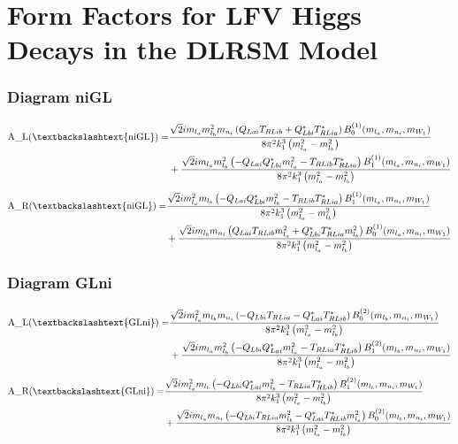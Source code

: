 \documentclass{article}
\begin{document}
\section*{Form Factors for LFV Higgs Decays in the DLRSM Model}
\subsubsection{Diagram niGL}
\begin{align*}
\mathtt{\text{A\_L(\textbackslashtext\{niGL\})}} = & \frac{\sqrt{2} i m_{l_a} m_{l_b}^{2} m_{n_i} \left(Q_{Lai} T_{RLib} + Q_{Lbi}^* T_{RLia}^*\right) B^{\left(1\right)}_0(m_{l_a}, m_{n_i}, m_{W_1})}{8 \pi^{2} k_{1}^{3} \left(m_{l_a}^{2} - m_{l_b}^{2}\right)} \\
& + \frac{\sqrt{2} i m_{l_a} m_{l_b}^{2} \left(- Q_{Lai} Q_{Lbi}^* m_{l_a}^{2} - T_{RLib} T_{RLia}^*\right) B^{\left(1\right)}_1(m_{l_a}, m_{n_i}, m_{W_1})}{8 \pi^{2} k_{1}^{3} \left(m_{l_a}^{2} - m_{l_b}^{2}\right)} 
\end{align*}
\begin{align*}
\mathtt{\text{A\_R(\textbackslashtext\{niGL\})}} = & \frac{\sqrt{2} i m_{l_a}^{2} m_{l_b} \left(- Q_{Lai} Q_{Lbi}^* m_{l_b}^{2} - T_{RLib} T_{RLia}^*\right) B^{\left(1\right)}_1(m_{l_a}, m_{n_i}, m_{W_1})}{8 \pi^{2} k_{1}^{3} \left(m_{l_a}^{2} - m_{l_b}^{2}\right)} \\
& + \frac{\sqrt{2} i m_{l_b} m_{n_i} \left(Q_{Lai} T_{RLib} m_{l_a}^{2} + Q_{Lbi}^* T_{RLia}^* m_{l_b}^{2}\right) B^{\left(1\right)}_0(m_{l_a}, m_{n_i}, m_{W_1})}{8 \pi^{2} k_{1}^{3} \left(m_{l_a}^{2} - m_{l_b}^{2}\right)} 
\end{align*}
\subsubsection{Diagram GLni}
\begin{align*}
\mathtt{\text{A\_L(\textbackslashtext\{GLni\})}} = & \frac{\sqrt{2} i m_{l_a}^{2} m_{l_b} m_{n_i} \left(- Q_{Lbi} T_{RLia} - Q_{Lai}^* T_{RLib}^*\right) B^{\left(2\right)}_0(m_{l_b}, m_{n_i}, m_{W_1})}{8 \pi^{2} k_{1}^{3} \left(m_{l_a}^{2} - m_{l_b}^{2}\right)} \\
& + \frac{\sqrt{2} i m_{l_a} m_{l_b}^{2} \left(- Q_{Lbi} Q_{Lai}^* m_{l_a}^{2} - T_{RLia} T_{RLib}^*\right) B^{\left(2\right)}_1(m_{l_b}, m_{n_i}, m_{W_1})}{8 \pi^{2} k_{1}^{3} \left(m_{l_a}^{2} - m_{l_b}^{2}\right)} 
\end{align*}
\begin{align*}
\mathtt{\text{A\_R(\textbackslashtext\{GLni\})}} = & \frac{\sqrt{2} i m_{l_a}^{2} m_{l_b} \left(- Q_{Lbi} Q_{Lai}^* m_{l_b}^{2} - T_{RLia} T_{RLib}^*\right) B^{\left(2\right)}_1(m_{l_b}, m_{n_i}, m_{W_1})}{8 \pi^{2} k_{1}^{3} \left(m_{l_a}^{2} - m_{l_b}^{2}\right)} \\
& + \frac{\sqrt{2} i m_{l_a} m_{n_i} \left(- Q_{Lbi} T_{RLia} m_{l_b}^{2} - Q_{Lai}^* T_{RLib}^* m_{l_a}^{2}\right) B^{\left(2\right)}_0(m_{l_b}, m_{n_i}, m_{W_1})}{8 \pi^{2} k_{1}^{3} \left(m_{l_a}^{2} - m_{l_b}^{2}\right)} 
\end{align*}
\end{document}
